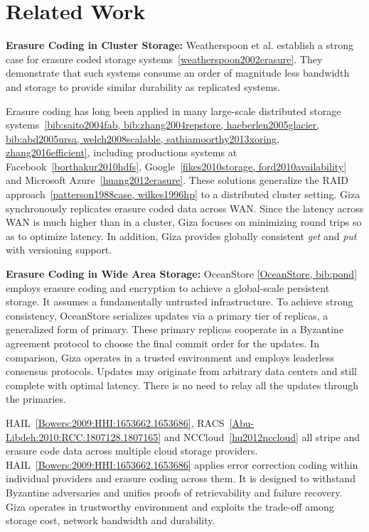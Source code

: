 \section{Related Work}


{\bf Erasure Coding in Cluster Storage:}
Weatherspoon et al. establish a strong case for erasure coded storage systems~\ref{weatherspoon2002erasure}. They demonstrate that such systems consume an order of magnitude less bandwidth and storage to provide similar durability as replicated systems.

Erasure coding has long been applied in many large-scale distributed storage systems~\ref{bib:saito2004fab, bib:zhang2004repstore, haeberlen2005glacier, bib:abd2005ursa, welch2008scalable, sathiamoorthy2013xoring, zhang2016efficient}, including productions systems at Facebook~\ref{borthakur2010hdfs}, Google~\ref{fikes2010storage, ford2010availability} and Microsoft Azure~\ref{huang2012erasure}. These solutions generalize the RAID approach~\ref{patterson1988case, wilkes1996hp} to a distributed cluster setting. Giza synchronously replicates erasure coded data across WAN. Since the latency across WAN is much higher than in a cluster, Giza focuses on minimizing round trips so as to optimize latency. In addition, Giza provides globally consistent {\em get} and {\em put} with versioning support.

{\bf Erasure Coding in Wide Area Storage:}
OceanStore \ref{OceanStore, bib:pond} employs erasure coding and encryption to achieve a global-scale persistent storage. It assumes a fundamentally untrusted infrastructure. To achieve strong consistency, OceanStore serializes updates via a primary tier of replicas, a generalized form of primary. These primary replicas cooperate in a Byzantine agreement protocol to choose the final commit order for the updates. In comparison, Giza operates in a trusted environment and employs leaderless consensus protocols. Updates may originate from arbitrary data centers and still complete with optimal latency. There is no need to relay all the updates through the primaries.

HAIL~\ref{Bowers:2009:HHI:1653662.1653686}, RACS~\ref{Abu-Libdeh:2010:RCC:1807128.1807165} and NCCloud~\ref{hu2012nccloud} all stripe and erasure code data across multiple cloud storage providers. 
HAIL~\ref{Bowers:2009:HHI:1653662.1653686} applies error correction coding within individual providers and erasure coding across them. It is designed to withstand Byzantine adversaries and unifies proofs of retrievability and failure recovery. Giza operates in trustworthy environment and exploits the trade-off among storage cost, network bandwidth and durability.

